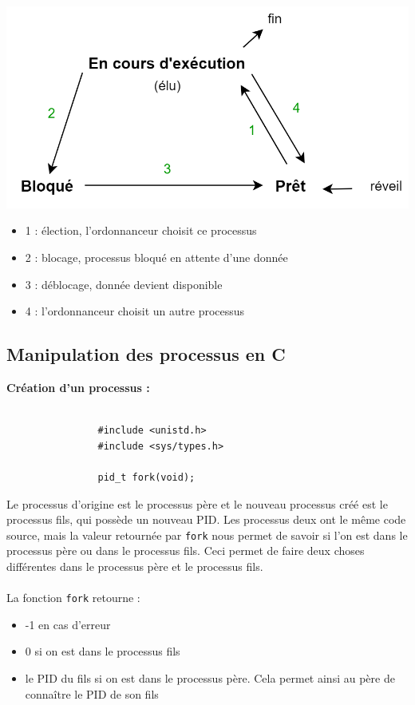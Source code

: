 		\begin{frame}
			\begin{center}\includegraphics[scale=0.3]{img/process.png}\end{center}
			
			\begin{itemize}
				\item 1 : élection, l'ordonnanceur choisit ce processus
				\item 2 : blocage, processus bloqué en attente d'une donnée
				\item 3 : déblocage, donnée devient disponible
				\item 4 : l'ordonnanceur choisit un autre processus
			\end{itemize}
		\end{frame}	
		
	\subsection{Manipulation des processus en C}
		\begin{frame}[containsverbatim]
			\textbf{Création d'un processus :}
			\\~\\
			\begin{lstlisting}
				#include <unistd.h>
				#include <sys/types.h>

				pid_t fork(void);
			\end{lstlisting}
			Le processus d'origine est le processus père et le nouveau processus créé est le processus fils, qui possède un nouveau PID. Les processus deux ont le même code source, mais la valeur retournée par \lstinline!fork! nous permet de savoir si l'on est dans le processus père ou dans le processus fils. Ceci permet de faire deux choses différentes dans le processus père et le processus fils.
			\\~\\
			\noindent La fonction \lstinline!fork! retourne :
			\begin{itemize}
				\item -1 en cas d'erreur
				\item 0 si on est dans le processus fils
				\item le PID du fils si on est dans le processus père. Cela permet ainsi au père de connaître le PID de son fils
			\end{itemize}
		
		\end{frame}	
		

